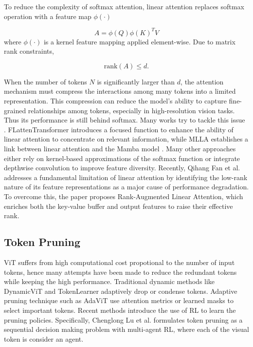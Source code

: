 To reduce the complexity of softmax attention, linear attention replaces softmax operation with a feature map $\phi(\cdot)$

\begin{equation}
  A = \phi(Q)\phi(K)^T V
\end{equation}
where $\phi(\cdot)$ is a kernel feature mapping applied element-wise.
Due to matrix rank constraints,

\begin{equation}
  \text{rank}(A) \le d.
\end{equation}

When the number of tokens $N$ is significantly larger than $d$, the attention mechanism must compress the interactions among many tokens into a limited representation. This compression can reduce the model's ability to capture fine-grained relationships among tokens, especially in high-resolution vision tasks. Thus its performance is still behind softmax. Many works try to tackle this issue \cite{cai2023efficientvit,han2023flatten,han2024demystify,katharopoulos2020transformers,lu2024softmax,shen2021efficient}.
FLattenTransformer \cite{han2023flatten} introduces a focused function to enhance the ability of linear attention to concentrate on relevant information, while MLLA \cite{han2024demystify} establishes a link between linear attention and the Mamba model \cite{gu2024mamba}.
Many other approaches either rely on kernel-based approximations of the softmax function or integrate depthwise convolution to improve feature diversity.
Recently, Qihang Fan et al. \cite{fan2025breaking} addresses a fundamental limitation of linear attention by identifying the low-rank nature of its feature representations as a major cause of performance degradation. To overcome this, the paper proposes Rank-Augmented Linear Attention, which enriches both the key-value buffer and output features to raise their effective rank.
\subsection{Token Pruning}

ViT suffers from high computational cost propotional to the number of input tokens, hence many attempts have been made to reduce the redundant tokens while keeping the high performance. Traditional dynamic methods like DynamicViT \cite{rao2021dynamicvit} and TokenLearner \cite{ryoo2021tokenlearner} adaptively drop or condense tokens. Adaptive pruning technique such as AdaViT \cite{meng2022adavit} use attention metrics or learned masks to select important tokens. Recent methods introduce the use of RL to learn the pruning policies. Specifically, Chenglong Lu et al. \cite{lu2025reinforcement} formulates token pruning as a sequential decision making problem with multi-agent RL, where each of the visual token is consider an agent.